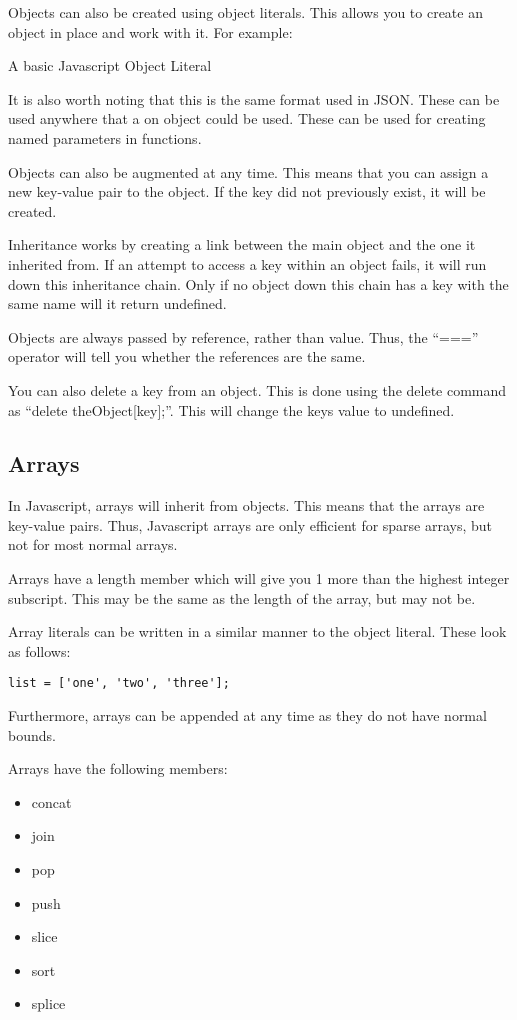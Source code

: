 			Objects can also be created using object literals. 
			This allows you to create an object in place and work with it.
			For example:
			\begin{code}
				
				\caption{A basic Javascript Object Literal}
				\label{code:JSObjectLiteral}
			\end{code}
			It is also worth noting that this is the same format used in JSON. 
			These can be used anywhere that a on object could be used. 
			These can be used for creating named parameters in functions. 

			Objects can also be augmented at any time. 
			This means that you can assign a new key-value pair to the object. 
			If the key did not previously exist, it will be created. 

			Inheritance works by creating a link between the main object and the one it inherited from. 
			If an attempt to access a key within an object fails, it will run down this inheritance chain. 
			Only if no object down this chain has a key with the same name will it return undefined. 
			
			Objects are always passed by reference, rather than value. 
			Thus, the ``==='' operator will tell you whether the references are the same. 

			You can also delete a key from an object. 
			This is done using the delete command as ``delete theObject[key];''. 
			This will change the keys value to undefined. 
		\subsection{Arrays}
			In Javascript, arrays will inherit from objects. 
			This means that the arrays are key-value pairs. 
			Thus, Javascript arrays are only efficient for sparse arrays, but not for most normal arrays. 

			Arrays have a length member which will give you 1 more than the highest integer subscript. 
			This may be the same as the length of the array, but may not be. 

			Array literals can be written in a similar manner to the object literal. 
			These look as follows:
			\begin{verbatim}
list = ['one', 'two', 'three'];
			\end{verbatim}
			Furthermore, arrays can be appended at any time as they do not have normal bounds. 

			Arrays have the following members:
			\begin{itemize}
				\item concat
				\item join
				\item pop
				\item push 
				\item slice
				\item sort
				\item splice
			\end{itemize}

